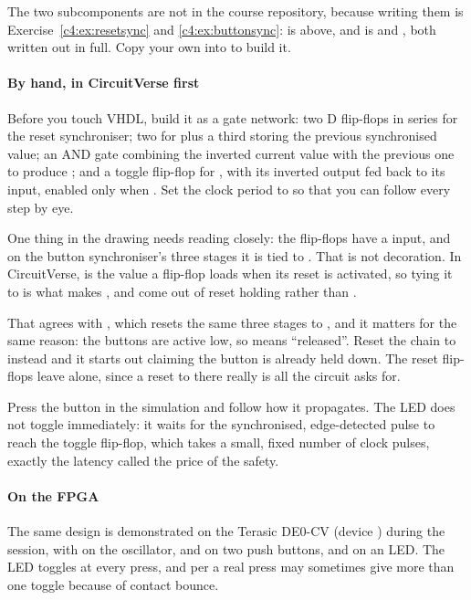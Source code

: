 The two subcomponents are not in the course repository, because writing them is
Exercise~\ref{c4:ex:resetsync} and \ref{c4:ex:buttonsync}:  is
 above, and  is  and
, both written out in full. Copy your own into  to
build it.

\paragraph{By hand, in CircuitVerse first}
Before you touch VHDL, build it as a gate network: two D flip-flops in series for the reset
synchroniser; two for  plus a third storing the previous synchronised value; an AND
gate combining the inverted current value with the previous one to produce ;
and a toggle flip-flop for , with its inverted output fed back to its input, enabled
only when . Set the clock period to  so that you can follow
every step by eye.


One thing in the drawing needs reading closely: the flip-flops have a  input, and on
the button synchroniser's three stages it is tied to . That is not decoration. In
CircuitVerse,  is the value a flip-flop loads when its reset is activated, so tying it
to  is what makes ,  and  come out of
reset holding  rather than .

That agrees with , which resets the same three stages to ,
and it matters for the same reason: the buttons are active low, so  means ``released''.
Reset the chain to  instead and it starts out claiming the button is already held down. The
reset flip-flops leave  alone, since a reset to  there really is all the
circuit asks for.

Press the button in the simulation and follow how it propagates. The LED does not toggle
immediately: it waits for the synchronised, edge-detected pulse to reach the toggle flip-flop, which
takes a small, fixed number of clock pulses, exactly the latency  called the
price of the safety.

\paragraph{On the FPGA}
The same design is demonstrated on the Terasic DE0-CV (device ) during the
session, with  on the  oscillator,  and  on
two push buttons, and  on an LED. The LED toggles at every press, and per
 a real press may sometimes give more than one toggle because of contact
bounce.

